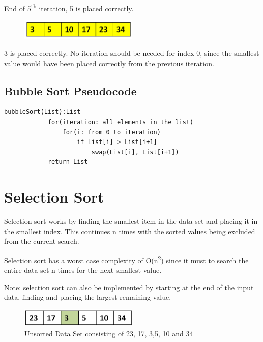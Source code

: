 End of 5\textsuperscript{th} iteration, 5 is placed correctly.

\begin{figure}[H]
\centering
\includegraphics[width=0.5\textwidth]{pictures/bubble12.png}
\label{fig:bubble12}
\end{figure}

3 is placed correctly. No iteration should be needed for index 0, since the smallest value would have been placed correctly from the previous iteration.

\subsection{Bubble Sort Pseudocode}

\begin{lstlisting}
bubbleSort(List):List
            for(iteration: all elements in the list)
                for(i: from 0 to iteration)
                    if List[i] > List[i+1]
                        swap(List[i], List[i+1])
            return List
\end{lstlisting}

\section{Selection Sort}
Selection sort works by finding the smallest item in the data set and placing it in the smallest index. This continues n times with the sorted values being excluded from the current search. \newline

Selection sort has a worst case complexity of O(n\textsuperscript{2}) since it must to search the entire data set n times for the next smallest value. \newline

Note: selection sort can also be implemented by starting at the end of the input data, finding and placing the largest remaining value.

\begin{figure}[H]
\centering
\includegraphics[width=0.5\textwidth]{pictures/selection1.png}
\caption{Unsorted Data Set consisting of 23, 17, 3,5, 10 and 34}
\label{fig:selection1}
\end{figure}

